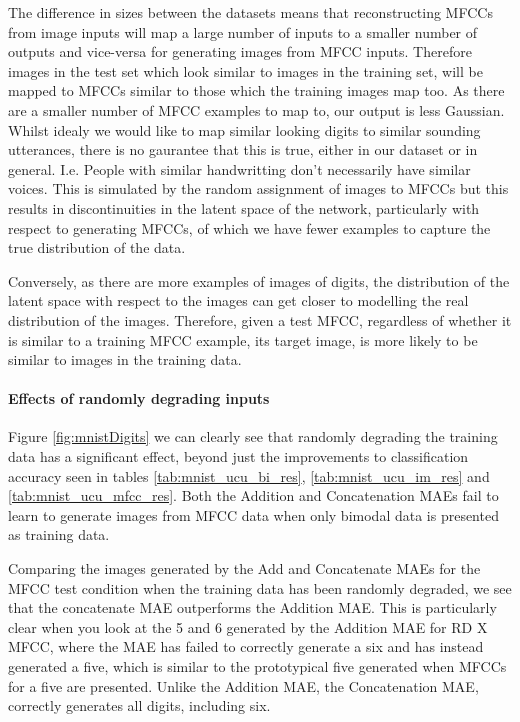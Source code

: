 The difference in sizes between the datasets means that reconstructing MFCCs from image inputs will map a large number of inputs to a smaller number of outputs and vice-versa for generating images from MFCC inputs. Therefore images in the test set which look similar to images in the training set, will be mapped to MFCCs similar to those which the training images map too. As there are a smaller number of MFCC examples to map to, our output is less Gaussian. Whilst idealy we would like to map similar looking digits to similar sounding utterances, there is no gaurantee that this is true, either in our dataset or in general. I.e. People with similar handwritting don't necessarily have similar voices. This is simulated by the random assignment of images to MFCCs but this results in discontinuities in the latent space of the network, particularly with respect to generating MFCCs, of which we have fewer examples to capture the true distribution of the data.

Conversely, as there are more examples of images of digits, the distribution of the latent space with respect to the images can get closer to modelling the real distribution of the images. Therefore, given a test MFCC, regardless of whether it is similar to a training MFCC example, its target image, is more likely to be similar to images in the training data.

\paragraph{Effects of randomly degrading inputs}
Figure \ref{fig:mnistDigits} we can clearly see that randomly degrading the training data has a significant effect, beyond just the improvements to classification accuracy seen in tables \ref{tab:mnist_ucu_bi_res}, \ref{tab:mnist_ucu_im_res} and \ref{tab:mnist_ucu_mfcc_res}. Both the Addition and Concatenation MAEs fail to learn to generate images from MFCC data when only bimodal data is presented as training data.

Comparing the images generated by the Add and Concatenate MAEs for the MFCC test condition when the training data has been randomly degraded, we see that the concatenate MAE outperforms the Addition MAE. This is particularly clear when you look at the 5 and 6 generated by the Addition MAE for RD X MFCC, where the MAE has failed to correctly generate a six and has instead generated a five, which is similar to the prototypical five generated when MFCCs for a five are presented.
Unlike the Addition MAE, the Concatenation MAE, correctly generates all digits, including six.

